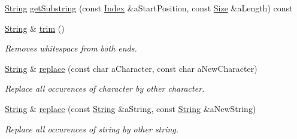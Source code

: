\begin{DoxyCompactItemize}
\item 
\hyperlink{classostk_1_1core_1_1types_1_1_string}{String} \hyperlink{classostk_1_1core_1_1types_1_1_string_a9d0043c1313395defb939d47a6717107}{get\+Substring} (const \hyperlink{namespaceostk_1_1core_1_1types_a6e63c1b15b2e5bc87a43771c09fa913a}{Index} \&a\+Start\+Position, const \hyperlink{namespaceostk_1_1core_1_1types_acf68f214a245e35a7c1994c84dc56746}{Size} \&a\+Length) const
\item 
\hyperlink{classostk_1_1core_1_1types_1_1_string}{String} \& \hyperlink{classostk_1_1core_1_1types_1_1_string_a3fae6c7f00df2fb868949179fa20033e}{trim} ()
\begin{DoxyCompactList}\small\item\em Removes whitespace from both ends. \end{DoxyCompactList}\item 
\hyperlink{classostk_1_1core_1_1types_1_1_string}{String} \& \hyperlink{classostk_1_1core_1_1types_1_1_string_a69b7f8a58ee5a55636b0dfd5d8b85e2c}{replace} (const char a\+Character, const char a\+New\+Character)
\begin{DoxyCompactList}\small\item\em Replace all occurences of character by other character. \end{DoxyCompactList}\item 
\hyperlink{classostk_1_1core_1_1types_1_1_string}{String} \& \hyperlink{classostk_1_1core_1_1types_1_1_string_ae5c391a85f0fb05c1c6c4c62e3ce1fcd}{replace} (const \hyperlink{classostk_1_1core_1_1types_1_1_string}{String} \&a\+String, const \hyperlink{classostk_1_1core_1_1types_1_1_string}{String} \&a\+New\+String)
\begin{DoxyCompactList}\small\item\em Replace all occurences of string by other string. \end{DoxyCompactList}\end{DoxyCompactItemize}
